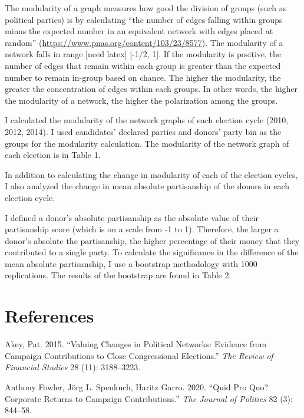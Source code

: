 \documentclass[11pt,]{article}
\begin{document}
The modularity of a graph measures how good the division of groups (such
as political parties) is by calculating ``the number of edges falling
within groups minus the expected number in an equivalent network with
edges placed at random''
(\url{https://www.pnas.org/content/103/23/8577}). The modularity of a
network falls in range {[}need latex{]} {[}-1/2, 1{]}. If the modularity
is positive, the number of edges that remain within each group is
greater than the expected number to remain in-group based on chance. The
higher the modularity, the greater the concentration of edges within
each groups. In other words, the higher the modularity of a network, the
higher the polarization among the groups.

I calculated the modularity of the network graphs of each election cycle
(2010, 2012, 2014). I used candidates' declared parties and donors'
party bin as the groups for the modularity calculation. The modularity
of the network graph of each election is in Table 1.

In addition to calculating the change in modularity of each of the
election cycles, I also analyzed the change in mean absolute
partisanship of the donors in each election cycle.

I defined a donor's absolute partisanship as the absolute value of their
partisanship score (which is on a scale from -1 to 1). Therefore, the
larger a donor's absolute the partisanship, the higher percentage of
their money that they contributed to a single party. To calculate the
significance in the difference of the mean absolute partisanship, I use
a bootstrap methodology with 1000 replications. The results of the
bootstrap are found in Table 2.

\hypertarget{references}{%
\section*{References}\label{references}}

\hypertarget{refs}{}
\leavevmode\hypertarget{ref-akey2015}{}%
Akey, Pat. 2015. ``Valuing Changes in Political Networks: Evidence from
Campaign Contributions to Close Congressional Elections.'' \emph{The
Review of Financial Studies} 28 (11): 3188--3223.

\leavevmode\hypertarget{ref-garro2020}{}%
Anthony Fowler, Jörg L. Spenkuch, Haritz Garro. 2020. ``Quid Pro Quo?
Corporate Returns to Campaign Contributions.'' \emph{The Journal of
Politics} 82 (3): 844--58.
\end{document}
